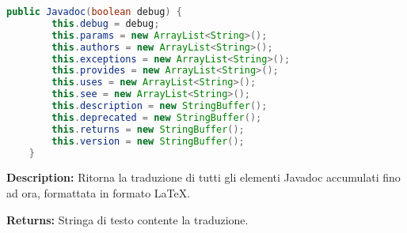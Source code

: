 \begin{lstlisting}[language=Java]
    public Javadoc(boolean debug) {
        this.debug = debug;
        this.params = new ArrayList<String>();
        this.authors = new ArrayList<String>();
        this.exceptions = new ArrayList<String>();
        this.provides = new ArrayList<String>();
        this.uses = new ArrayList<String>();
        this.see = new ArrayList<String>();
        this.description = new StringBuffer();
        this.deprecated = new StringBuffer();
        this.returns = new StringBuffer();
        this.version = new StringBuffer();
    }
\end{lstlisting}
\vspace{0.5cm}
\textbf{Description:}  Ritorna la traduzione di tutti gli elementi Javadoc accumulati fino ad ora, formattata in formato LaTeX.  

\textbf{Returns:}
Stringa di testo contente la traduzione.  


